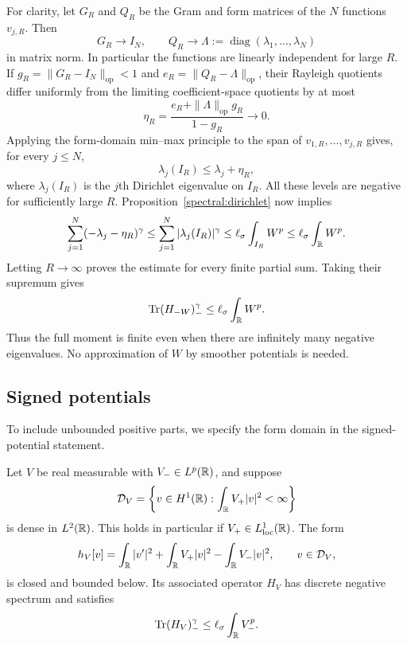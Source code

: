 For clarity, let $G_R$ and $Q_R$ be the Gram and form matrices of the
$N$ functions $v_{j,R}$.  Then
\[
 G_R\longrightarrow I_N,
 \qquad
 Q_R\longrightarrow\Lambda
 :=\operatorname{diag}(\lambda_1,\ldots,\lambda_N)
\]
in matrix norm.  In particular the functions are linearly independent
for large $R$.  If $g_R=\|G_R-I_N\|_{\mathrm{op}}<1$ and
$e_R=\|Q_R-\Lambda\|_{\mathrm{op}}$, their Rayleigh quotients differ
uniformly from the limiting coefficient-space quotients by at most
\[
 \eta_R=\frac{e_R+\|\Lambda\|_{\mathrm{op}}g_R}{1-g_R}
 \longrightarrow0.
\]
Applying the form-domain min--max principle
\cite[Theorem~4.10 and the following form-domain extension]{Teschl2009}
to the span of
$v_{1,R},\ldots,v_{j,R}$ gives, for every $j\leq N$,
\[
 \lambda_j(I_R)\leq\lambda_j+\eta_R,
\]
where $\lambda_j(I_R)$ is the $j$th Dirichlet eigenvalue on $I_R$.
All these levels are negative for sufficiently large $R$.
Proposition~\ref{spectral:dirichlet} now implies
\[
 \sum_{j=1}^N(-\lambda_j-\eta_R)^\gamma
 \leq \sum_{j=1}^N|\lambda_j(I_R)|^\gamma
 \leq \ell_\sigma\int_{I_R}W^p
 \leq \ell_\sigma\int_\mathbb R W^p.
\]
Letting $R\to\infty$ proves the estimate for every finite partial
sum.  Taking their supremum gives
\begin{equation}\label{spectral:line-bound}
 \operatorname{Tr}(H_{-W})_-^\gamma
 \leq \ell_\sigma\int_\mathbb R W^p.
\end{equation}
Thus the full moment is finite even when there are infinitely many
negative eigenvalues.  No approximation of $W$ by smoother potentials
is needed.

\subsection{Signed potentials}

To include unbounded positive parts, we specify the form domain in the
signed-potential statement.

\begin{corollary}\label{spectral:signed}
Let $V$ be real measurable with $V_-\in L^p(\mathbb R)$, and suppose
\[
 \mathcal D_V
 =\left\{v\in H^1(\mathbb R):\int_\mathbb R V_+|v|^2<\infty\right\}
\]
is dense in $L^2(\mathbb R)$.  This holds in particular if
$V_+\in L^1_{\mathrm{loc}}(\mathbb R)$.  The form
\[
 h_V[v]=\int_\mathbb R|v'|^2+\int_\mathbb R V_+|v|^2-\int_\mathbb R V_-|v|^2,
 \qquad v\in\mathcal D_V,
\]
is closed and bounded below.  Its associated operator $H_V$ has
discrete negative spectrum and satisfies
\[
 \operatorname{Tr}(H_V)_-^\gamma\leq\ell_\sigma\int_\mathbb R V_-^p.
\]
\end{corollary}

